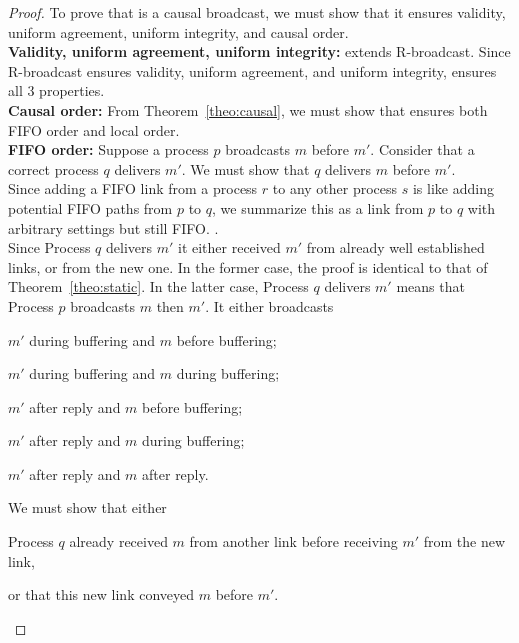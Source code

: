\begin{proof}
  To prove that \CBROADCAST is a causal broadcast, we must show that it ensures
  validity, uniform agreement, uniform integrity, and causal order. \\
  \textbf{Validity, uniform agreement, uniform integrity:} \CBROADCAST extends
  R-broadcast. Since R-broadcast ensures validity, uniform agreement, and uniform
  integrity, \CBROADCAST ensures all 3 properties. \\
  \textbf{Causal order:} From Theorem~\ref{theo:causal}, we must show
  that \CBROADCAST ensures both FIFO order and local order. \\
  \textbf{FIFO order:} Suppose a process $p$ broadcasts $m$ before
  $m'$. Consider that a correct process $q$ delivers $m'$. We must show that $q$
  delivers $m$ before $m'$. \\
  Since adding a FIFO link from a process $r$ to any other process $s$ is like
  adding potential FIFO paths from $p$ to $q$, we summarize this as a link from
  $p$ to $q$ with arbitrary settings but still FIFO.  . \\
  Since Process $q$ delivers $m'$ it either received $m'$ from already well
  established links, or from the new one. In the former case, the proof is
  identical to that of Theorem~\ref{theo:static}. In the latter case, Process
  $q$ delivers $m'$ means that Process $p$ broadcasts $m$ then $m'$. It either
  broadcasts
  \begin{inparaenum}[(i)]
  \item \label{case:one} $m'$ during buffering and $m$ before buffering;
  \item \label{case:two} $m'$ during buffering and $m$ during buffering;
  \item \label{case:three} $m'$ after reply and $m$ before buffering;
  \item \label{case:four} $m'$ after reply and $m$ during buffering;
  \item \label{case:five} $m'$ after reply and $m$ after reply.
  \end{inparaenum}
  We must show that either 
  \begin{inparaenum}[(1)]
  \item \label{show:one} Process $q$ already received $m$ from another link
    before receiving $m'$ from the new link,
  \item \label{show:two} or that this new link conveyed $m$ before $m'$.
  \end{inparaenum}


\end{proof}
